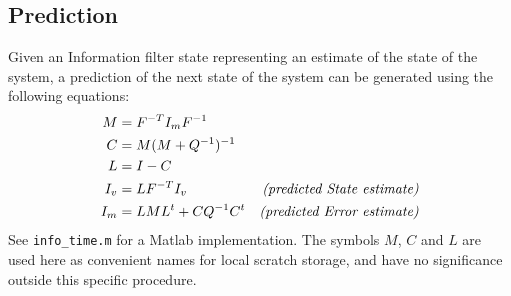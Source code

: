 \subsection{Prediction}
Given an Information filter state
representing an estimate of the state of the system,
a prediction of the next state of the system
can be generated using the following equations:
\begin{subequations}
\label{infotime}
\begin{align}
  M & = F^{-T} I_m F^{-1}
\\
  C & = M (M + Q^{-1})^{-1}
\\
  L & = I - C
\\
  I_v & = L F^{-T} I_v
  & \mbox{\it (predicted State estimate)}
\label{infotimed}
\\
  I_m & = L M L^t + C Q^{-1} C^t
  & \mbox{\it (predicted Error estimate)}
\label{infotimel}
\end{align}
\end{subequations}
See \verb|info_time.m|
for a Matlab implementation.
The symbols $M$, $C$ and $L$
are used here as convenient names
for local scratch storage,
and have no significance
outside this specific procedure.
